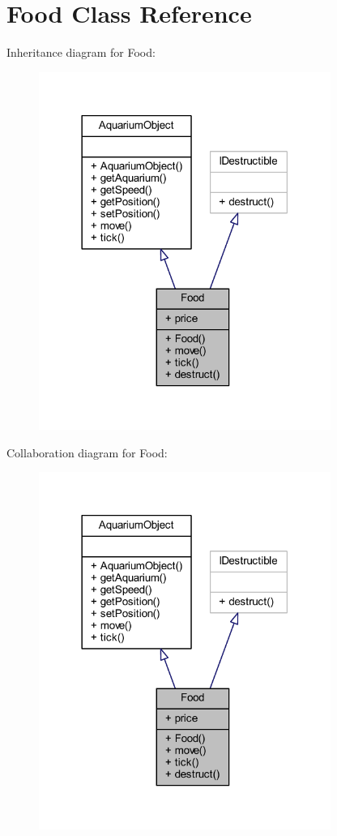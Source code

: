 \hypertarget{class_food}{}\section{Food Class Reference}
\label{class_food}


Inheritance diagram for Food\+:
\nopagebreak
\begin{figure}[H]
\begin{center}
\leavevmode
\includegraphics[width=270pt]{class_food__inherit__graph}
\end{center}
\end{figure}


Collaboration diagram for Food\+:
\nopagebreak
\begin{figure}[H]
\begin{center}
\leavevmode
\includegraphics[width=270pt]{class_food__coll__graph}
\end{center}
\end{figure}
